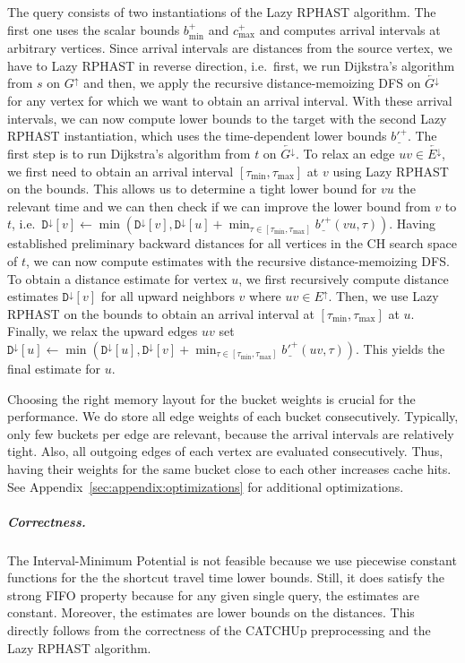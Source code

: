 \documentclass[a4paper,UKenglish,cleveref, autoref, thm-restate,anonymous]{lipics-v2021}
\newcommand*{\comb}{c}
\newcommand*{\gchu}{G^{\uparrow}}
\newcommand*{\gchd}{\overleftarrow{G^{\downarrow}}}
\newcommand*{\echu}{E^{\uparrow}}
\newcommand*{\echd}{\overleftarrow{E^{\downarrow}}}
\newcommand*{\pcfn}{\underline{b'^+}}
\begin{document}
The query consists of two instantiations of the Lazy RPHAST algorithm.
The first one uses the scalar bounds $b^+_{\min}$ and $\comb^+_{\max}$ and computes arrival intervals at arbitrary vertices.
Since arrival intervals are distances from the source vertex, we have to Lazy RPHAST in reverse direction, i.e.\ first, we run Dijkstra's algorithm from $s$ on $\gchu$ and then, we apply the recursive distance-memoizing DFS on $\gchd$ for any vertex for which we want to obtain an arrival interval.
With these arrival intervals, we can now compute lower bounds to the target with the second Lazy RPHAST instantiation, which uses the time-dependent lower bounds $\pcfn$.
The first step is to run Dijkstra's algorithm from $t$ on $\gchd$.
To relax an edge $uv \in \echd$, we first need to obtain an arrival interval $[\tau_{\min}, \tau_{\max}]$ at $v$ using Lazy RPHAST on the bounds.
This allows us to determine a tight lower bound for $vu$ the relevant time and we can then check if we can improve the lower bound from $v$ to $t$, i.e.\
$\mathtt{D}^{\downarrow}[v] \leftarrow \min(\mathtt{D}^{\downarrow}[v], \mathtt{D}^{\downarrow}[u] + \min_{\tau \in [\tau_{\min}, \tau_{\max}]} \pcfn(vu, \tau))$.
Having established preliminary backward distances for all vertices in the CH search space of $t$, we can now compute estimates with the recursive distance-memoizing DFS.
To obtain a distance estimate for vertex $u$, we first recursively compute distance estimates $\mathtt{D}^{\downarrow}[v]$ for all upward neighbors $v$ where $uv \in \echu$.
Then, we use Lazy RPHAST on the bounds to obtain an arrival interval at $[\tau_{\min}, \tau_{\max}]$ at $u$.
Finally, we relax the upward edges $uv$ set $\mathtt{D}^{\downarrow}[u] \leftarrow \min(\mathtt{D}^{\downarrow}[u], \mathtt{D}^{\downarrow}[v] + \min_{\tau \in [\tau_{\min}, \tau_{\max}]} \pcfn(uv, \tau))$.
This yields the final estimate for $u$.

Choosing the right memory layout for the bucket weights is crucial for the performance.
We do store all edge weights of each bucket consecutively.
Typically, only few buckets per edge are relevant, because the arrival intervals are relatively tight.
Also, all outgoing edges of each vertex are evaluated consecutively.
Thus, having their weights for the same bucket close to each other increases cache hits.
See Appendix~\ref{sec:appendix:optimizations} for additional optimizations.

\subparagraph{Correctness.}
The Interval-Minimum Potential is not feasible because we use piecewise constant functions for the the shortcut travel time lower bounds.
Still, it does satisfy the strong FIFO property because for any given single query, the estimates are constant.
Moreover, the estimates are lower bounds on the distances.
This directly follows from the correctness of the CATCHUp preprocessing and the Lazy RPHAST algorithm.
\end{document}
